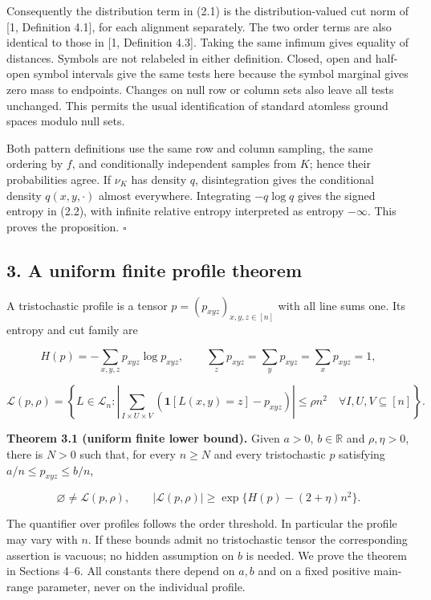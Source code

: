 \documentclass[english,11pt,a4paper]{article}
\begin{document}
Consequently the distribution term in (2.1) is the distribution-valued cut norm of {[}1, Definition 4.1{]}, for each alignment separately. The two order terms are also identical to those in {[}1, Definition 4.3{]}. Taking the same infimum gives equality of distances. Symbols are not relabeled in either definition. Closed, open and half-open symbol intervals give the same tests here because the symbol marginal gives zero mass to endpoints. Changes on null row or column sets also leave all tests unchanged. This permits the usual identification of standard atomless ground spaces modulo null sets.

Both pattern definitions use the same row and column sampling, the same ordering by \(f\), and conditionally independent samples from \(K\); hence their probabilities agree. If \(\nu_K\) has density \(q\), disintegration gives the conditional density \(q(x,y,\cdot)\) almost everywhere. Integrating \(-q\log q\) gives the signed entropy in (2.2), with infinite relative entropy interpreted as entropy \(-\infty\). This proves the proposition. \(\square\)

\subsection{3. A uniform finite profile theorem}\label{a-uniform-finite-profile-theorem}

A tristochastic profile is a tensor \(p=(p_{xyz})_{x,y,z\in[n]}\) with all line sums one. Its entropy and cut family are

\nopagebreak[4]
\[H(p)=-\sum_{x,y,z}p_{xyz}\log p_{xyz},\qquad
\sum_zp_{xyz}=\sum_yp_{xyz}=\sum_xp_{xyz}=1,\tag{3.1}\]

\nopagebreak[4]
\[\mathcal L(p,\rho)=\left\{L\in\mathcal L_n:
\left|\sum_{I\times U\times V}(\mathbf1[L(x,y)=z]-p_{xyz})\right|\le\rho n^2
\quad\forall I,U,V\subseteq[n]\right\}.\tag{3.2}\]

\textbf{Theorem 3.1 (uniform finite lower bound).} Given \(a>0\), \(b\in\mathbb R\) and \(\rho,\eta>0\), there is \(N>0\) such that, for every \(n\ge N\) and every tristochastic \(p\) satisfying \(a/n\le p_{xyz}\le b/n\),

\nopagebreak[4]
\[\varnothing\ne\mathcal L(p,\rho),\qquad |\mathcal L(p,\rho)|\ge\exp\{H(p)-(2+\eta)n^2\}.\tag{3.3}\]

The quantifier over profiles follows the order threshold. In particular the profile may vary with \(n\). If these bounds admit no tristochastic tensor the corresponding assertion is vacuous; no hidden assumption on \(b\) is needed. We prove the theorem in Sections 4--6. All constants there depend on \(a,b\) and on a fixed positive main-range parameter, never on the individual profile.
\end{document}
